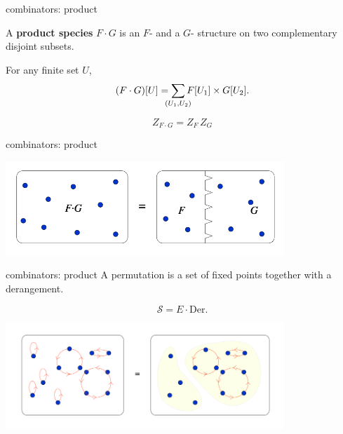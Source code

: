 \documentclass{beamer}
\begin{document}
\begin{frame}{combinators: product}

  A \textbf{product species} $F\cdot G$ is an $F$- and a $G$- structure on two complementary disjoint subsets.

  For any finite set $U$,
  \[
    (F\cdot G)[U] = \sum_{\mathclap{(U_1,U_2)}} F[U_1] \times G[U_2].
  \] \pause

  \[
    Z_{F\cdot G} = Z_F\, Z_G
  \]

\end{frame}

\begin{frame}{combinators: product}
  \begin{center}
    \includegraphics[width=10.5cm]{figures/product.png}
  \end{center}
\end{frame}

\begin{frame}{combinators: product}
  A permutation is a set of fixed points together with a derangement.

  \[
    \mathcal S = E\cdot \mathrm{Der}.
  \]

  \begin{center}
    \includegraphics[width=10.5cm]{figures/permutation.png}
  \end{center}
\end{frame}
\end{document}
